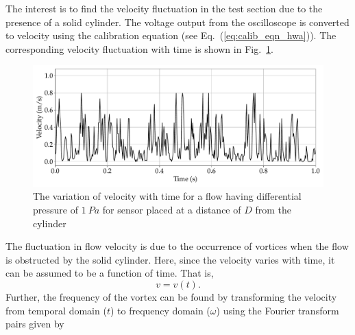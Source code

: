 The interest is to find the velocity fluctuation in the test section due to the presence of a solid cylinder. The voltage output from the oscilloscope is converted to velocity using the calibration equation (see Eq.~(\ref{eq:calib_eqn_hwa})). The corresponding velocity fluctuation with time is shown in Fig.~\ref{fig:vortex_D_1Pa_vel}.

\begin{figure}
    \centering
    \includegraphics[width=\linewidth]{gfx/velocity_vs_time_for_1Pa_1s.pdf}
    \caption{The variation of velocity with time for a flow having differential pressure of $1~Pa$ for sensor placed at a distance of $D$ from the cylinder}
    \label{fig:vortex_D_1Pa_vel}
\end{figure}
The fluctuation in flow velocity is due to the occurrence of vortices when the flow is obstructed by the solid cylinder. Here, since the velocity varies with time, it can be assumed to be a function of time. That is,
\begin{equation}
    v = v(t).
\end{equation}
Further, the frequency of the vortex can be found by transforming the velocity from temporal domain ($t$) to frequency domain ($\omega$) using the Fourier transform pairs given by

